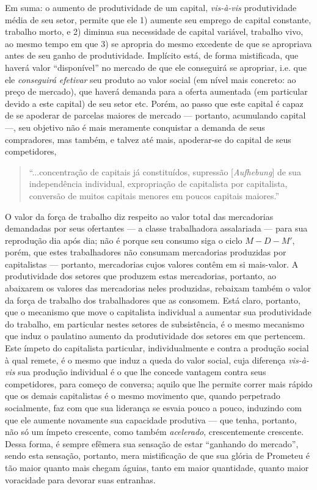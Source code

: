 Em suma: o aumento de produtividade de um capital, \textit{vis-à-vis} produtividade média de seu setor, permite que ele 1) aumente seu emprego de capital constante, trabalho morto, e 2) diminua sua necessidade de capital variável, trabalho vivo, ao mesmo tempo em que 3) se apropria do mesmo excedente de que se apropriava antes de seu ganho de produtividade. Implícito está, de forma mistificada, que haverá valor ``disponível'' no mercado de que ele conseguirá se apropriar, i.e. que ele \textit{conseguirá efetivar} seu produto ao valor social (em nível mais concreto: ao preço de mercado), que haverá demanda para a oferta aumentada (em particular devido a este capital) de seu setor etc. Porém, ao passo que este capital é capaz de se apoderar de parcelas maiores de mercado — portanto, acumulando capital —, seu objetivo não é mais meramente conquistar a demanda de seus compradores, mas também, e talvez até mais, apoderar-se do capital de seus competidores,
\begin{quote}
``...concentração de capitais já constituídos, supressão [\textit{Aufhebung}] de sua independência individual, expropriação de capitalista por capitalista, conversão de muitos capitais menores em poucos capitais maiores.'' \parencite[p. 701]{Marx2017}
\end{quote}

O valor da força de trabalho diz respeito ao valor total das mercadorias demandadas por seus ofertantes — a classe trabalhadora assalariada — para sua reprodução dia após dia; não é porque seu consumo siga o ciclo $M-D-M'$, porém, que estes trabalhadores não consumam mercadorias produzidas por capitalistas — portanto, mercadorias cujos valores contêm em si mais-valor. A produtividade dos setores que produzem estas mercadorias, portanto, ao abaixarem os valores das mercadorias neles produzidas, rebaixam também o valor da força de trabalho dos trabalhadores que as consomem. Está claro, portanto, que o mecanismo que move o capitalista individual a aumentar sua produtividade do trabalho, em particular nestes setores de subsistência, é o mesmo mecanismo que induz o paulatino aumento da produtividade dos setores em que pertencem. Este ímpeto do capitalista particular, individualmente e contra a produção social à qual remete, é o mesmo que induz a queda do valor social, cuja diferença \textit{vis-à-vis} sua produção individual é o que lhe concede vantagem contra seus competidores, para começo de conversa; aquilo que lhe permite correr mais rápido que os demais capitalistas é o mesmo movimento que, quando perpetrado socialmente, faz com que sua liderança se esvaia pouco a pouco, induzindo com que ele aumente novamente sua capacidade produtiva — que tenha, portanto, não só um ímpeto crescente, como também \textit{acelerado}, crescentemente crescente. Dessa forma, é sempre efêmera sua sensação de estar ``ganhando do mercado'', sendo esta sensação, portanto, mera mistificação de que sua glória de Prometeu é tão maior quanto mais chegam águias, tanto em maior quantidade, quanto maior voracidade para devorar suas entranhas. 

